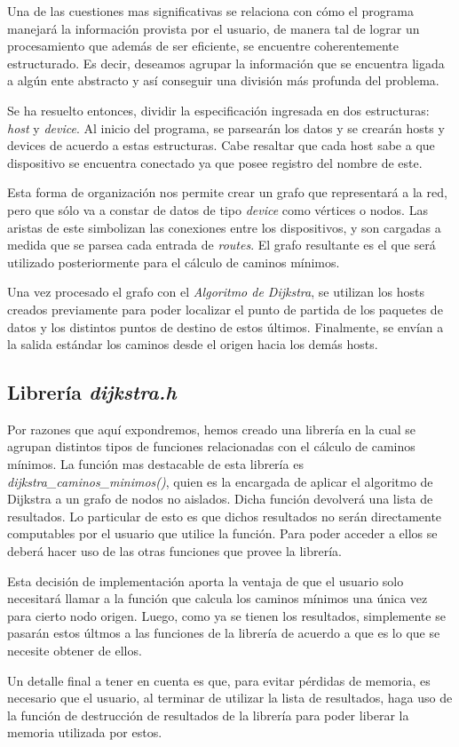 \documentclass{article}
\begin{document}
	Una de las cuestiones mas significativas se relaciona con cómo el programa manejará la información provista por el usuario, de manera tal de lograr un procesamiento que además de ser eficiente, se encuentre coherentemente estructurado. Es decir, deseamos agrupar la información que se encuentra ligada a algún ente abstracto y así conseguir una división más profunda del problema.
	\par
	Se ha resuelto entonces, dividir la especificación ingresada en dos estructuras: \textit{host} y \textit{device}. Al inicio del programa, se parsearán los datos y se crearán hosts y devices de acuerdo a estas estructuras. Cabe resaltar que cada host sabe a que dispositivo se encuentra conectado ya que posee registro del nombre de este.
	\par
	Esta forma de organización nos permite crear un grafo que representará a la red, pero que sólo va a constar de datos de tipo \textit{device} como vértices o nodos. Las aristas de este simbolizan las conexiones entre los dispositivos, y son cargadas a medida que se parsea cada entrada de \textit{routes}. El grafo resultante es el que será utilizado posteriormente para el cálculo de caminos mínimos.
	\par
	Una vez procesado el grafo con el \textit{Algoritmo de Dijkstra}, se utilizan los hosts creados previamente para poder localizar el punto de partida de los paquetes de datos y los distintos puntos de destino de estos últimos. Finalmente, se envían a la salida estándar los caminos desde el origen hacia los demás hosts.
\bigskip



\subsection{Librería \textit{dijkstra.h}}

	Por razones que aquí expondremos, hemos creado una librería en la cual se agrupan distintos tipos de funciones relacionadas con el cálculo de caminos mínimos. La función mas destacable de esta librería es \textit{dijkstra\_caminos\_minimos()}, quien es la encargada de aplicar el algoritmo de Dijkstra a un grafo de nodos no aislados. Dicha función devolverá una lista de resultados. Lo particular de esto es que dichos resultados no serán directamente computables por el usuario que utilice la función. Para poder acceder a ellos se deberá hacer uso de las otras funciones que provee la librería.
	\par
	Esta decisión de implementación aporta la ventaja de que el usuario solo necesitará llamar a la función que calcula los caminos mínimos una única vez para cierto nodo origen. Luego, como ya se tienen los resultados, simplemente se pasarán estos últmos a las funciones de la librería de acuerdo a que es lo que se necesite obtener de ellos.
	\par
	Un detalle final a tener en cuenta es que, para evitar pérdidas de memoria, es necesario que el usuario, al terminar de utilizar la lista de resultados, haga uso de la función de destrucción de resultados de la librería para poder liberar la memoria utilizada por estos.
\bigskip
\end{document}
